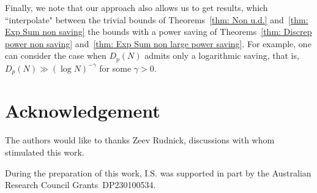 \documentclass[12pt]{amsart}
\numberwithin{equation}{section}
\numberwithin{theorem}{section}
\numberwithin{table}{section}
\numberwithin{figure}{section}
\begin{document}
Finally, we note that our approach also allows us to get results, which ``interpolate" between 
the  trivial bounds of  Theorems~\ref{thm: Non u.d.}  and~\ref{thm: Exp Sum non saving} 
 the bounds with a power saving 
of Theorems~\ref{thm: Discrep power non saving} and~\ref{thm: Exp Sum non large power saving}. 
For example, one can consider the case 
when $D_p(N)$ admits only a logarithmic saving, that is, $D_p(N) \gg (\log N)^{-\gamma}$ 
for some $\gamma >0$. 

 
\section*{Acknowledgement}


The authors would like to thanks Zeev Rudnick, discussions with whom stimulated this work. 

During the preparation of this work, I.S. was supported in part by the Australian Research Council Grants~DP230100534. 
\end{document}
